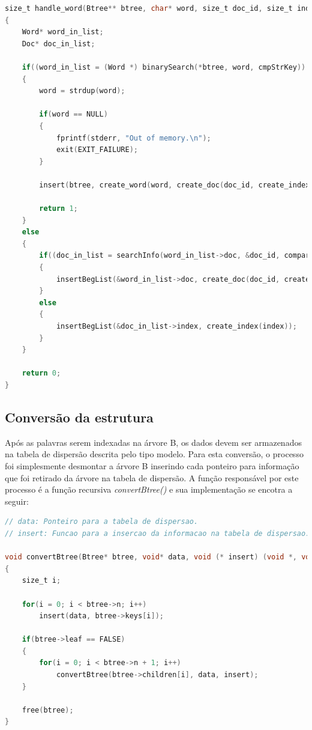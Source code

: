 \documentclass[a4paper,12pt]{article}
\begin{document}
\begin{lstlisting}[language=C, caption=Função handle\_word]
size_t handle_word(Btree** btree, char* word, size_t doc_id, size_t index)
{
	Word* word_in_list;
	Doc* doc_in_list;

	if((word_in_list = (Word *) binarySearch(*btree, word, cmpStrKey)) == NULL)
	{
		word = strdup(word);
		
		if(word == NULL)
		{
			fprintf(stderr, "Out of memory.\n");
			exit(EXIT_FAILURE);
		}

		insert(btree, create_word(word, create_doc(doc_id, create_index(index))), cmpKey);

		return 1;
	}
	else
	{
		if((doc_in_list = searchInfo(word_in_list->doc, &doc_id, compare_doc)) == NULL)
		{
			insertBegList(&word_in_list->doc, create_doc(doc_id, create_index(index)));
		}
		else
		{
			insertBegList(&doc_in_list->index, create_index(index));
		}
	}

	return 0;
}
\end{lstlisting}


\subsection{Conversão da estrutura}
Após as palavras serem indexadas na árvore B, os dados devem ser armazenados na tabela de dispersão descrita pelo tipo modelo.
Para esta conversão, o processo foi simplesmente desmontar a árvore B inserindo cada ponteiro para informação que foi retirado 
da árvore na tabela de dispersão. 
A função responsável por este processo é a função recursiva \emph{convertBtree()} e sua implementação se encotra a seguir:


\begin{lstlisting}[language=C, caption=Função convertBtree]
// data: Ponteiro para a tabela de dispersao.                           
// insert: Funcao para a insercao da informacao na tabela de dispersao. 

void convertBtree(Btree* btree, void* data, void (* insert) (void *, void *))
{
	size_t i;

	for(i = 0; i < btree->n; i++)
		insert(data, btree->keys[i]);

	if(btree->leaf == FALSE)
	{
		for(i = 0; i < btree->n + 1; i++)
			convertBtree(btree->children[i], data, insert);
	}

	free(btree);
}
\end{lstlisting}
\end{document}
